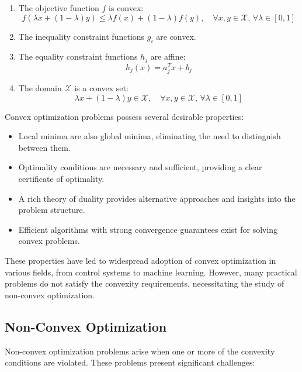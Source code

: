 \begin{enumerate}
\item The objective function $f$ is convex:
\begin{equation}
f(\lambda x + (1-\lambda)y) \leq \lambda f(x) + (1-\lambda)f(y), \quad \forall x,y \in \mathcal{X}, \, \forall \lambda \in [0,1]
\end{equation}

\item The inequality constraint functions $g_i$ are convex.

\item The equality constraint functions $h_j$ are affine:
\begin{equation}
h_j(x) = a_j^T x + b_j
\end{equation}

\item The domain $\mathcal{X}$ is a convex set:
\begin{equation}
\lambda x + (1-\lambda)y \in \mathcal{X}, \quad \forall x,y \in \mathcal{X}, \, \forall \lambda \in [0,1]
\end{equation}
\end{enumerate}

Convex optimization problems possess several desirable properties:

\begin{itemize}
\item Local minima are also global minima, eliminating the need to distinguish between them.
\item Optimality conditions are necessary and sufficient, providing a clear certificate of optimality.
\item A rich theory of duality provides alternative approaches and insights into the problem structure.
\item Efficient algorithms with strong convergence guarantees exist for solving convex problems.
\end{itemize}

These properties have led to widespread adoption of convex optimization in various fields, from control systems to machine learning. However, many practical problems do not satisfy the convexity requirements, necessitating the study of non-convex optimization.

\subsection{Non-Convex Optimization}

Non-convex optimization problems arise when one or more of the convexity conditions are violated. These problems present significant challenges:

